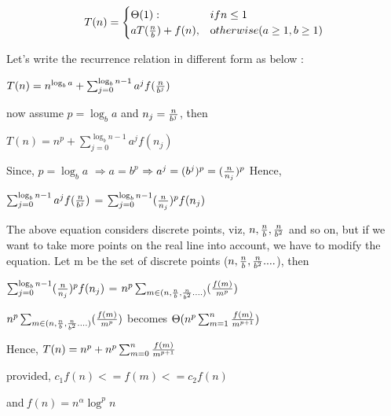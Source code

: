 \documentclass[11pt]{article}
\begin{document}
\begin{equation*}
T(n) = \begin{cases}
  \Theta(1):  &\text{$if n \leq 1$}\\
    aT({n \over b}) + f(n), & \text otherwise(a \geq 1,b\geq 1)

\end{cases}
\end{equation*}

Let's write the recurrence relation in different form as below :
\begin{center}
$T{(n)} = n^{\log_b a} + \sum_{j=0}^{\log_b n - 1} a^j f({n \over b^j}) $
\end{center}
now assume $p = \log_b a$ and $n_j = {n \over b^j}$, then
\begin{center}
$T{(n)} = n^p + \sum_{j=0}^{\log_b n - 1} a^j f({n_j}) $
\newline
\end{center}
Since,
$p = \log_b a$
$\Rightarrow a = b^p $
$\Rightarrow a^j = (b^j)^p = ({n \over n_j})^p$
\newline
Hence, 
\begin{center}
$ \sum_{j=0}^{\log_b n - 1} a^j f({n \over b^j}) $ =  $\sum_{j=0}^{\log_b n - 1} ({n \over n_j})^p f({n_j}) $
\end{center}

The above equation considers discrete points, viz, ${n},  {n \over b} , {n \over b^2 }$ and so on, but if we want to take more points on the real line into account, we have to modify the equation. Let m be the set of discrete points (${n}, {n \over b}, {n \over b^2}....$), then

\begin{center}
$\sum_{j=0}^{\log_b n - 1} ({n \over n_j})^p f({n_j}) $ =  $ n^p \sum_{m \in ({n}, {n \over b}, {n \over b^2}....)} ({f({m}) \over m^p})$
\end{center}

\begin{center}
$ n^p \sum_{m \in ({n}, {n \over b}, {n \over b^2}....)} ({f({m}) \over m^p})$ becomes $\Theta ({n^p}\sum_{m=1}^{n}{f(m)\over m^{p+1}})$
\end{center}

\begin{center}
   Hence, $T{(n)} = n^p + n^p \sum_{m=0}^n { {f(m)} \over m^{p+1}} $
\end{center}
\begin{center}
provided, $  c_1{f(n)} <= {f(m)} <= c_2{f(n)}$ \end{center}
\begin{center}
and$\ f(n) = n^\alpha \log^p n $
\end{center}
\end{document}
